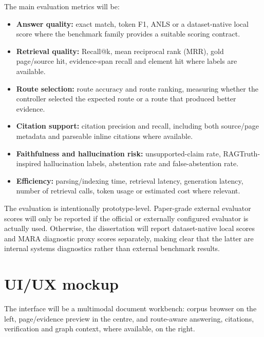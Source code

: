 \documentclass[a4paper,11pt]{article}
\begin{document}
The main evaluation metrics will be:
\begin{itemize}
  \item \textbf{Answer quality:} exact match, token F1, ANLS or a dataset-native local score where the benchmark family provides a suitable scoring contract.
  \item \textbf{Retrieval quality:} Recall@k, mean reciprocal rank (MRR), gold page/source hit, evidence-span recall and element hit where labels are available.
  \item \textbf{Route selection:} route accuracy and route ranking, measuring whether the controller selected the expected route or a route that produced better evidence.
  \item \textbf{Citation support:} citation precision and recall, including both source/page metadata and parseable inline citations where available.
  \item \textbf{Faithfulness and hallucination risk:} unsupported-claim rate, RAGTruth-inspired hallucination labels, abstention rate and false-abstention rate.
  \item \textbf{Efficiency:} parsing/indexing time, retrieval latency, generation latency, number of retrieval calls, token usage or estimated cost where relevant.
\end{itemize}

The evaluation is intentionally prototype-level. Paper-grade external evaluator scores will only be reported if the official or externally configured evaluator is actually used. Otherwise, the dissertation will report dataset-native local scores and MARA diagnostic proxy scores separately, making clear that the latter are internal systems diagnostics rather than external benchmark results.

\section{UI/UX mockup}

The interface will be a multimodal document workbench: corpus browser on the left, page/evidence preview in the centre, and route-aware answering, citations, verification and graph context, where available, on the right.
\end{document}
